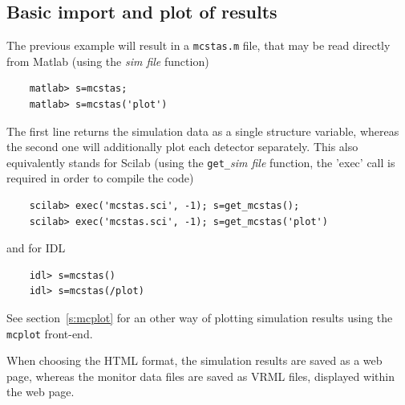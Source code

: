 \subsection{Basic import and plot of results}
\label{s:run-format}
The previous example will result in a \verb+mcstas.m+ file, that may be read directly from Matlab (using the {\it sim file} function)
\begin{verbatim}
    matlab> s=mcstas;
    matlab> s=mcstas('plot')
\end{verbatim} 
The first line returns the simulation data as a single structure variable, whereas the second one will additionally plot each detector separately.
This also equivalently stands for Scilab (using the \verb+get_+{\it sim file} function, the 'exec' call is required in order to compile the code)
\begin{verbatim}
    scilab> exec('mcstas.sci', -1); s=get_mcstas();
    scilab> exec('mcstas.sci', -1); s=get_mcstas('plot')
\end{verbatim} 
and for IDL
\begin{verbatim}
    idl> s=mcstas()
    idl> s=mcstas(/plot)
\end{verbatim} 
See section~\ref{s:mcplot} for an other way of plotting simulation results using the \verb+mcplot+ front-end. 

When choosing the HTML format, the simulation results are saved as a web page, whereas the monitor data files are saved as VRML files, displayed within the web page.

